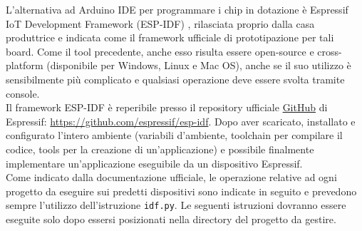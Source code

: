 \noindent L'alternativa ad Arduino IDE per programmare i chip in dotazione è Espressif IoT Development Framework (ESP-IDF) \cite{esp32doc}, rilasciata proprio dalla casa produttrice e indicata come il framework ufficiale di prototipazione per tali board.
Come il tool precedente, anche esso risulta essere open-source e cross-platform (disponibile per Windows, Linux e Mac OS), anche se il suo utilizzo è sensibilmente più complicato e qualsiasi operazione deve essere svolta tramite console.\\
Il framework ESP-IDF è reperibile presso il repository ufficiale \href{https://github.com/espressif/esp-idf}{GitHub} di Espressif: \url{https://github.com/espressif/esp-idf}. Dopo aver scaricato, installato e configurato l'intero ambiente (variabili d'ambiente, toolchain per compilare il codice, tools per la creazione di un'applicazione) e possibile finalmente implementare un'applicazione eseguibile da un dispositivo Espressif.\\
Come indicato dalla documentazione ufficiale, le operazione relative ad ogni progetto da eseguire sui predetti dispositivi sono indicate in seguito e prevedono sempre l'utilizzo dell'istruzione \texttt{idf.py}. Le seguenti istruzioni dovranno essere eseguite solo dopo essersi posizionati nella directory del progetto da gestire.
\renewcommand{\theenumi}{\roman{enumi}}
